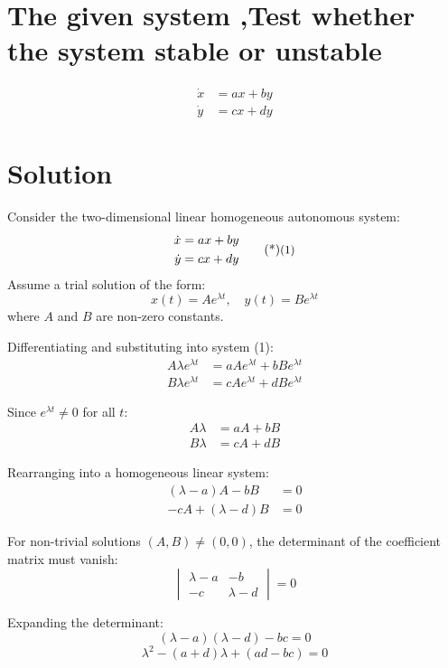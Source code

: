 \section{The given system ,Test whether the system stable or unstable}
\begin{align*}
    \dot{x}&=ax+by\\
    \dot{y} &=cx+dy
\end{align*}
\section*{Solution}
Consider the two-dimensional linear homogeneous autonomous system:
\begin{equation}
    \begin{aligned}
        \dot{x} &= ax + by \\
        \dot{y} &= cx + dy
    \end{aligned} \sidenote{1}
\end{equation}
Assume a trial solution of the form:
\[
x(t) = A e^{\lambda t}, \quad y(t) = B e^{\lambda t}
\]
where $A$ and $B$ are non-zero constants.

\noindent Differentiating and substituting into system (1):
\begin{align*}
    A \lambda e^{\lambda t} &= a A e^{\lambda t} + b B e^{\lambda t} \\
    B \lambda e^{\lambda t} &= c A e^{\lambda t} + d B e^{\lambda t}
\end{align*}

\noindent Since $e^{\lambda t} \neq 0$ for all $t$:
\begin{align*}
    A \lambda &= a A + b B \\
    B \lambda &= c A + d B
\end{align*}

\noindent Rearranging into a homogeneous linear system:
\begin{align*}
    (\lambda - a)A - b B &= 0 \\
    -cA + (\lambda - d)B &= 0
\end{align*}

\noindent For non-trivial solutions $(A, B) \neq (0, 0)$, the determinant of the coefficient matrix must vanish:
\[
\begin{vmatrix}
\lambda - a & -b \\
-c & \lambda - d
\end{vmatrix} = 0
\]

\noindent Expanding the determinant:
\[
(\lambda - a)(\lambda - d) - bc = 0
\]
\[
\lambda^2 - (a + d)\lambda + (ad - bc) = 0
\]

